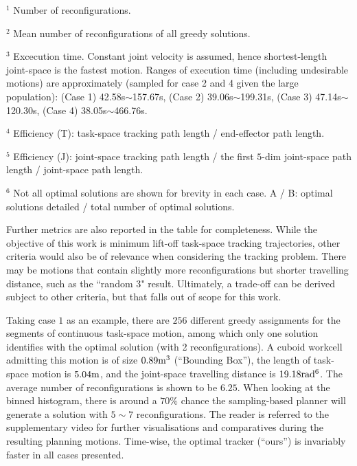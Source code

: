 \documentclass[letterpaper, 10 pt, journal, twoside]{ieeetran}  %
\begin{document}
\begin{table}[t]
\begin{tabular}{c|c|c|c|c|c|c|c|c}
\\
\hline
\end{tabular}
\begin{tablenotes}[t]
\item $^1$ Number of reconfigurations. 
\item $^2$ Mean number of reconfigurations of all greedy solutions. 
\item $^3$ Excecution time. Constant joint velocity is assumed, hence shortest-length joint-space is the fastest motion. Ranges of execution time (including undesirable motions) are approximately (sampled for case 2 and 4 given the large population): (Case 1) 42.58s$\sim$157.67s, (Case 2) 39.06s$\sim$199.31s, (Case 3) 47.14s$\sim$120.30s, (Case 4) 38.05s$\sim$466.76s.
\item $^4$ Efficiency (T): task-space tracking path length / end-effector path length.
\item $^5$ Efficiency (J): joint-space tracking path length / the first $5$-dim joint-space path length / joint-space path length. 
\item $^6$ Not all optimal solutions are shown for brevity in each case. A / B: optimal solutions detailed /  total number of optimal solutions. 
\end{tablenotes}
\vspace{-0.5cm}
\end{table}



Further metrics are also reported in the table for completeness. While the objective of this work is minimum lift-off task-space tracking trajectories, other criteria would also 
be of relevance when considering the tracking problem. %
There may be motions that contain slightly more reconfigurations but shorter travelling distance, such as the ``random 3"  result. 
Ultimately, a trade-off can be derived subject to other criteria, but that falls out of scope for this work. 

Taking  case $1$ as an example, there are $256$ different greedy assignments for the segments of continuous task-space motion, among which only one solution identifies with the 
optimal solution (with 2 reconfigurations). 
A cuboid workcell admitting this motion is of size ${\rm 0.89m^3}$ (``Bounding Box''), the length of task-space motion is ${\rm 5.04m}$, and the joint-space travelling distance is 
${\rm 19.18rad^6}$. 
The average number of reconfigurations is shown to be $6.25$. When looking at the binned histogram, there is around a $70\%$ chance the sampling-based planner will generate a solution with $5\sim7$ reconfigurations. 
The reader is referred to the supplementary video for further visualisations and comparatives during the resulting planning motions. Time-wise, the optimal tracker (``ours'') is invariably faster in all cases presented.
\end{document}
